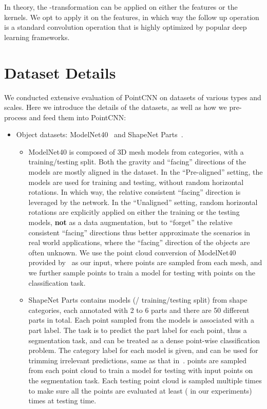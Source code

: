 \documentclass{article}
\begin{document}
In theory, the -transformation can be applied on either the features or the kernels. We opt to apply it on the features, in which way the follow up operation is a standard convolution operation that is highly optimized by popular deep learning frameworks.

\section{Dataset Details}
\label{sec:dataset_details}

We conducted extensive evaluation of PointCNN on datasets of various types and scales. Here we introduce the details of the datasets, as well as how we pre-process and feed them into PointCNN:
\begin{itemize}[leftmargin=*]
	\item Object datasets: ModelNet40~\cite{Wu_CVPR15} and ShapeNet Parts~\cite{Yi_SIGGRAPHAsia16}.
	\begin{itemize}
		\item ModelNet40 is composed of  3D mesh models from  categories, with a  training/testing split. Both the gravity and ``facing'' directions of the models are mostly aligned in the dataset. In the ``Pre-aligned'' setting, the models are used for training and testing, without random horizontal rotations. In which way, the relative consistent ``facing'' direction is leveraged by the network. In the ``Unaligned'' setting, random horizontal rotations are explicitly applied on either the training or the testing models, \textbf{not} as a data augmentation, but to ``forget'' the relative consistent ``facing'' directions thus better approximate the scenarios in real world applications, where the ``facing'' direction of the objects are often unknown. We use the point cloud conversion of ModelNet40 provided by~\cite{Qi_CVPR17} as our input, where  points are sampled from each mesh, and we further sample  points to train a model for testing with  points on the classification task.
		\item ShapeNet Parts contains  models (/ training/testing split) from  shape categories, each annotated with 2 to 6 parts and there are 50 different parts in total. Each point sampled from the models is associated with a part label. The task is to predict the part label for each point, thus a segmentation task, and can be treated as a dense point-wise classification problem. The category label for each model is given, and can be used for trimming irrelevant predictions, same as that in~\cite{graham20173d}.  points are sampled from each point cloud to train a model for testing with  input points on the segmentation task. Each testing point cloud is sampled multiple times to make sure all the points are evaluated at least  ( in our experiments) times at testing time.
	\end{itemize}


\end{itemize}
\end{document}
